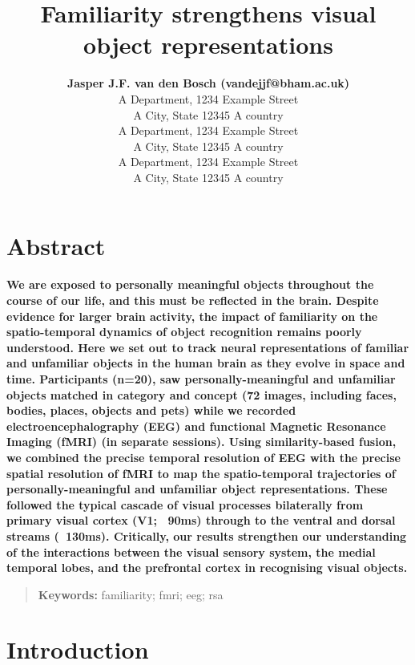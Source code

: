 \documentclass[10pt,letterpaper]{article}
\title{Familiarity strengthens visual object representations}
\author{{\large \bf Jasper J.F. van den Bosch (vandejjf@bham.ac.uk)} \\
  A Department, 1234 Example Street\\
A City, State 12345 A country
  \AND {\large \bf Cyril Pernet (cyril.pernet@ed.ac.uk)} \\
  A Department, 1234 Example Street\\
A City, State 12345 A country
  \AND {\large \bf Ian Charest (charesti@bham.ac.uk)} \\
  A Department, 1234 Example Street\\
A City, State 12345 A country}
\begin{document}
\maketitle


\section{Abstract}
{
\bf
We are exposed to personally meaningful objects throughout the 
course of our life, and this must  be reflected in the brain. 
Despite evidence for larger brain activity, the impact of 
familiarity on the spatio-temporal dynamics of object recognition 
remains poorly understood. Here we set out to track neural 
representations of familiar and unfamiliar objects in the human 
brain as they evolve in space and time. Participants (n=20), 
saw personally-meaningful and unfamiliar objects matched in 
category and concept (72 images, including faces, bodies, 
places, objects and pets) while we recorded electroencephalography 
(EEG) and functional Magnetic Resonance Imaging (fMRI) (in separate 
sessions). Using similarity-based fusion, we combined the precise 
temporal resolution of EEG with the precise spatial resolution of 
fMRI to map the spatio-temporal trajectories of personally-meaningful 
and unfamiliar object representations. These followed the typical 
cascade of visual processes bilaterally from primary visual cortex 
(V1; ~90ms) through to the ventral and dorsal streams (~130ms). 
Critically, our results strengthen our understanding of the interactions 
between the visual sensory system, the medial temporal lobes, and 
the prefrontal cortex in recognising visual objects. 
}
\begin{quote}
\small
\textbf{Keywords:} 
familiarity; fmri; eeg; rsa
\end{quote}

\section{Introduction}
\end{document}
